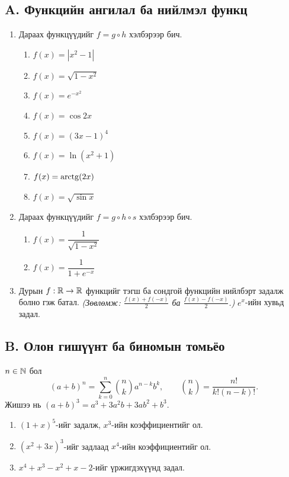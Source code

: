 \subsection*{A. Функцийн ангилал ба нийлмэл функц}
\begin{enumerate}
\item Дараах функцүүдийг $f=g\circ h$ хэлбэрээр бич.
\begin{enumerate}
  \item $f(x)=|x^2-1|$
  \item $f(x)=\sqrt{1-x^2}$
  \item $f(x)=e^{-x^2}$
  \item $f(x)=\cos 2x$
  \item $f(x)=(3x-1)^4$
  \item $f(x)=\ln(x^2+1)$
  \item $f(x)=\operatorname{arctg}(2x)$
  \item $f(x)=\sqrt{\sin x}$
\end{enumerate}
\item Дараах функцүүдийг $f=g\circ h\circ s$ хэлбэрээр бич.
\begin{enumerate}
  \item $f(x)=\dfrac{1}{\sqrt{1-x^2}}$
  \item $f(x)=\dfrac{1}{1+e^{-x}}$
\end{enumerate}
\item Дурын $f:\mathbb{R}\to\mathbb{R}$ функцийг тэгш ба сондгой функцийн нийлбэрт задалж болно гэж батал.
      \textit{(Зөвлөмж: $\frac{f(x)+f(-x)}{2}$ ба $\frac{f(x)-f(-x)}{2}$.)} $e^x$-ийн хувьд задал.
\end{enumerate}

\subsection*{B. Олон гишүүнт ба биномын томьёо}
\begin{theorem}
$n\in\mathbb{N}$ бол
\[
(a+b)^n=\sum_{k=0}^{n}\binom{n}{k}a^{n-k}b^k,\qquad \binom nk=\frac{n!}{k!(n-k)!}.
\]
Жишээ нь $(a+b)^3=a^3+3a^2b+3ab^2+b^3$.
\end{theorem}

\begin{enumerate}[resume]
\item $(1+x)^5$-ийг задалж, $x^3$-ийн коэффициентийг ол.
\item $(x^2+3x)^3$-ийг задлаад $x^4$-ийн коэффициентийг ол.
\item $x^4+x^3-x^2+x-2$-ийг үржигдэхүүнд задал.
\end{enumerate}

